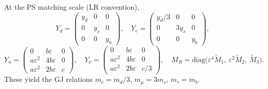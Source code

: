 \documentclass[11pt]{article}
\begin{document}
          At the PS matching scale (LR convention),
          \begin{equation}
          Y_d=\begin{pmatrix}y_d&0&0\\[2pt]0&y_s&0\\[2pt]0&0&y_b\end{pmatrix},\quad
          Y_e=\begin{pmatrix}y_d/3&0&0\\[2pt]0&3y_s&0\\[2pt]0&0&y_b\end{pmatrix},
          \end{equation}
          \begin{equation}
          Y_u=\begin{pmatrix}
          0&b\varepsilon&0\\
          a\varepsilon^2&4b\varepsilon&0\\
          a\varepsilon^2&2b\varepsilon&c
          \end{pmatrix},\quad
          Y_\nu=\begin{pmatrix}
          0&b\varepsilon&0\\
          a\varepsilon^2&4b\varepsilon&0\\
          a\varepsilon^2&2b\varepsilon&c/3
          \end{pmatrix},\quad
          M_R=\mathrm{diag}\!\big(\varepsilon^4\tilde M_1,\ \varepsilon^2\tilde M_2,\ \tilde M_3\big).
          \end{equation}
          These yield the GJ relations $m_e=m_d/3$, $m_\mu=3m_s$, $m_\tau=m_b$.
\end{document}

